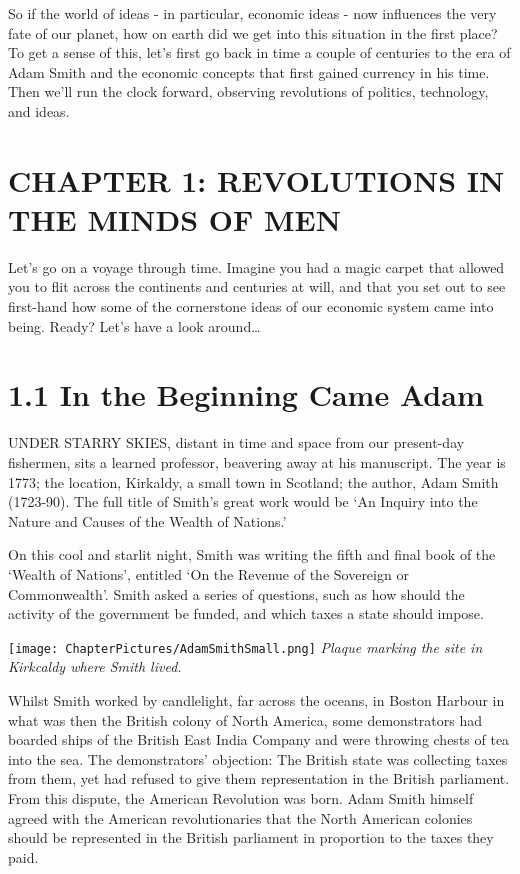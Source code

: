\documentclass[]{tufte-handout}
\begin{document}
So if the world of ideas - in particular, economic ideas - now
influences the very fate of our planet, how on earth did we get into
this situation in the first place? To get a sense of this, let's first
go back in time a couple of centuries to the era of Adam Smith and the
economic concepts that first gained currency in his time. Then we'll run
the clock forward, observing revolutions of politics, technology, and
ideas.

\newpage

\hypertarget{chapter-1-revolutions-in-the-minds-of-men}{%
\section{CHAPTER 1: REVOLUTIONS IN THE MINDS OF
MEN}\label{chapter-1-revolutions-in-the-minds-of-men}}

Let's go on a voyage through time. Imagine you had a magic carpet that
allowed you to flit across the continents and centuries at will, and
that you set out to see first-hand how some of the cornerstone ideas of
our economic system came into being. Ready? Let's have a look
around\ldots{}

\hypertarget{in-the-beginning-came-adam}{%
\section{1.1 In the Beginning Came
Adam}\label{in-the-beginning-came-adam}}

UNDER STARRY SKIES, distant in time and space from our present-day
fishermen, sits a learned professor, beavering away at his manuscript.
The year is 1773; the location, Kirkaldy, a small town in Scotland; the
author, Adam Smith (1723-90). The full title of Smith's great work would
be `An Inquiry into the Nature and Causes of the Wealth of Nations.'

On this cool and starlit night, Smith was writing the fifth and final
book of the `Wealth of Nations', entitled `On the Revenue of the
Sovereign or Commonwealth'. Smith asked a series of questions, such as
how should the activity of the government be funded, and which taxes a
state should impose.

\texttt{[image: ChapterPictures/AdamSmithSmall.png]} \emph{Plaque
marking the site in Kirkcaldy where Smith lived.}

Whilst Smith worked by candlelight, far across the oceans, in Boston
Harbour in what was then the British colony of North America, some
demonstrators had boarded ships of the British East India Company and
were throwing chests of tea into the sea. The demonstrators' objection:
The British state was collecting taxes from them, yet had refused to
give them representation in the British parliament. From this dispute,
the American Revolution was born. Adam Smith himself agreed with the
American revolutionaries that the North American colonies should be
represented in the British parliament in proportion to the taxes they
paid.
\end{document}
